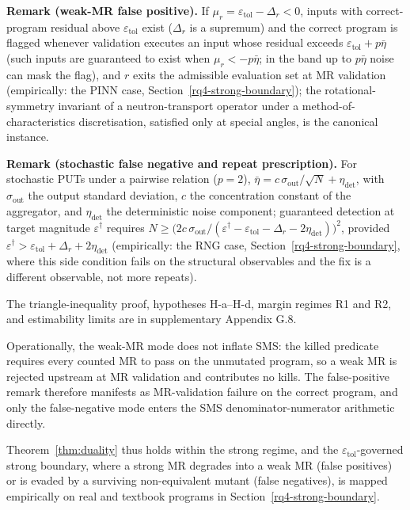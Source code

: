 \documentclass[review,12pt,authoryear]{elsarticle}
\begin{document}
\textbf{Remark (weak-MR false positive).} If
$\mu_r = \varepsilon_{\mathrm{tol}} - \Delta_r < 0$, inputs with
correct-program residual above $\varepsilon_{\mathrm{tol}}$ exist
($\Delta_r$ is a supremum) and the correct program is flagged whenever
validation executes an input whose residual exceeds
$\varepsilon_{\mathrm{tol}} + p\bar\eta$ (such inputs are guaranteed to
exist when $\mu_r < -p\bar\eta$; in the band up to $p\bar\eta$ noise can
mask the flag), and $r$ exits the admissible evaluation set at MR
validation (empirically: the PINN case,
Section~\ref{rq4-strong-boundary}); the rotational-symmetry invariant of
a neutron-transport operator under a method-of-characteristics
discretisation, satisfied only at special angles, is the canonical
instance.

\textbf{Remark (stochastic false negative and repeat prescription).} For
stochastic PUTs under a pairwise relation ($p = 2$),
$\bar\eta = c\,\sigma_{\mathrm{out}}/\sqrt{N} + \eta_{\mathrm{det}}$,
with $\sigma_{\mathrm{out}}$ the output standard deviation, $c$ the
concentration constant of the aggregator, and $\eta_{\mathrm{det}}$ the
deterministic noise component; guaranteed detection at target magnitude
$\varepsilon^\dagger$ requires
$N \geq \bigl(2c\,\sigma_{\mathrm{out}}/(\varepsilon^\dagger - \varepsilon_{\mathrm{tol}} - \Delta_r - 2\eta_{\mathrm{det}})\bigr)^2$,
provided
$\varepsilon^\dagger > \varepsilon_{\mathrm{tol}} + \Delta_r + 2\eta_{\mathrm{det}}$
(empirically: the RNG case, Section~\ref{rq4-strong-boundary}, where
this side condition fails on the structural observables and the fix is a
different observable, not more repeats).

The triangle-inequality proof, hypotheses H-a--H-d, margin regimes R1
and R2, and estimability limits are in supplementary Appendix G.8.

Operationally, the weak-MR mode does not inflate SMS: the killed
predicate requires every counted MR to pass on the unmutated program, so
a weak MR is rejected upstream at MR validation and contributes no
kills. The false-positive remark therefore manifests as MR-validation
failure on the correct program, and only the false-negative mode enters
the SMS denominator-numerator arithmetic directly.

Theorem~\ref{thm:duality} thus holds within the strong regime, and the
$\varepsilon_{\mathrm{tol}}$-governed strong boundary, where a strong
MR degrades into a weak MR (false positives) or is evaded by a surviving
non-equivalent mutant (false negatives), is mapped empirically on real
and textbook programs in Section~\ref{rq4-strong-boundary}.
\end{document}
